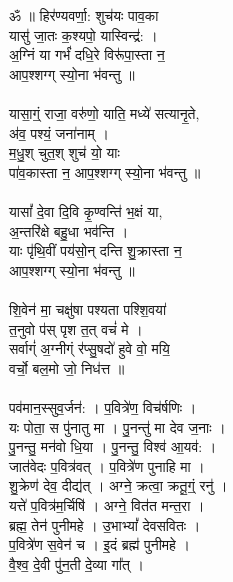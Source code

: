 \section{}
\subsection{}
ॐ ॥ हिर॑ण्यवर्णा॒: शुच॑यः पाव॒का \\
यासु॑ जा॒तः क॒श्यपो॒ यास्विन्द्र॑: ।\\
अ॒ग्निं या गर्भं॑ दधि॒रे विरू॑पा॒स्ता न॒ \\
आप॒श्शग्ग् स्यो॒ना भ॑वन्तु ॥\\
\\
यासा॒ग्ं॒ राजा॒ वरु॑णो॒ याति॒ मध्ये॑ सत्यानृ॒ते, \\
अ॑व॒ पश्यं॒ जना॑नाम् ।\\
म॒धु॒श् चुत॒श् शुच॑ यो॒ याः \\
पा॑व॒कास्ता न॒ आप॒श्शग्ग् स्यो॒ना भ॑वन्तु ॥\\
\\
यासां᳚ दे॒वा दि॒वि कृ॒ण्वन्ति॑ भ॒क्षं या,\\
अ॒न्तरि॑क्षे बहु॒धा भव॑न्ति ।\\
याः पृ॑थि॒वीं पय॑सो॒न् दन्ति शु॒क्रास्ता न॒ \\
आप॒श्शग्ग् स्यो॒ना भ॑वन्तु ॥\\
\\
शि॒वेन॑ मा॒ चक्षु॑षा पश्यता पश्शि॒वया॑\\
त॒नुवो प॑स् पृश त॒त् वचं॑ मे ।\\
सर्वाग्ं॑ अ॒ग्नीग्ं र॑प्सु॒षदो॑ हुवे वो॒ मयि॒\\
वर्चो॒ बल॒मो जो॒ निध॑त्त ॥\\
\\
पव॑मान॒स्सुव॒र्जन॑: । प॒वित्रे॑ण॒ विच॑र्षणिः ।\\
यः पोता॒ स पु॑नातु मा । पु॒नन्तु॑ मा देव ज॒नाः ।\\
पु॒नन्तु॒ मन॑वो धि॒या । पु॒नन्तु॒ विश्व॑ आ॒यव॑: ।\\
जात॑वेदः प॒वित्र॑वत् । प॒वित्रे॑ण पुनाहि मा ।\\
शु॒क्रेण॑ देव॒ दीद्य॑त् । अग्ने॒ क्रत्वा॒ क्रतू॒ग्ं॒ रनु॑ ।\\
यत्ते॑ प॒वित्र॑म॒र्चिषि॑ । अग्ने॒ वित॑त मन्त॒रा ।\\
ब्रह्म॒ तेन॑ पुनीमहे । उ॒भाभ्यां᳚ देवसवितः ।\\
प॒वित्रे॑ण स॒वेन॑ च । इ॒दं ब्रह्म॑ पुनीमहे ।\\
वै॒श्व॒ दे॒वी पु॑न॒ती दे॒व्या गा᳚त् ।\\
